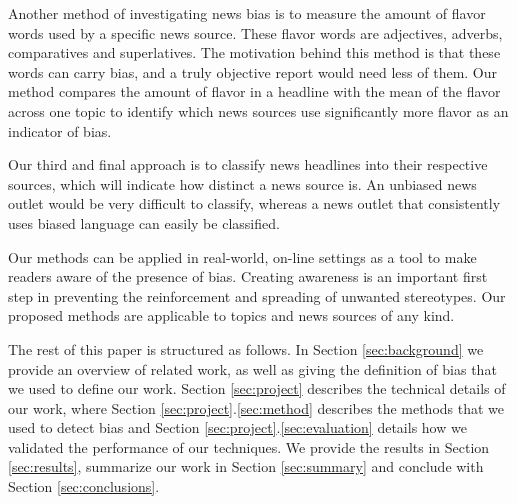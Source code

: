 \documentclass[final]{ieee}
\begin{document}
Another method of investigating news bias is to measure the amount of flavor words used by a specific news source. These flavor words are adjectives, adverbs, comparatives and superlatives. The motivation behind this method is that these words can carry bias, and a truly objective report would need less of them. Our method compares the amount of flavor in a headline with the mean of the flavor across one topic to identify which news sources use significantly more flavor as an indicator of bias. 

Our third and final approach is to classify news headlines into their respective sources, which will indicate how distinct a news source is. An unbiased news outlet would be very difficult to classify, whereas a news outlet that consistently uses biased language can easily be classified.

Our methods can be applied in real-world, on-line settings as a tool to make readers aware of the presence of bias. Creating awareness is an important first step in preventing the reinforcement and spreading of unwanted stereotypes. Our proposed methods are applicable to topics and news sources of any kind.

The rest of this paper is structured as follows. In Section \ref{sec:background} we provide an overview of related work, as well as giving the definition of bias that we used to define our work. Section \ref{sec:project} describes the technical details of our work, where Section \ref{sec:project}.\ref{sec:method} describes the methods that we used to detect bias and Section \ref{sec:project}.\ref{sec:evaluation} details how we validated the performance of our techniques. We provide the results in Section \ref{sec:results}, summarize our work in Section \ref{sec:summary} and conclude with Section \ref{sec:conclusions}. 




     
\end{document}
